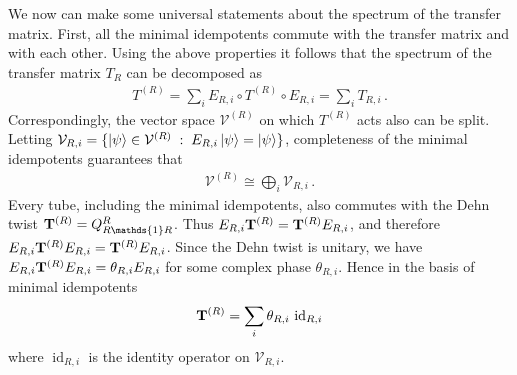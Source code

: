 We now can make some universal statements about the spectrum of the transfer matrix. 
First, all the minimal idempotents commute with the transfer matrix and with each other. 
Using the above properties it follows that the spectrum of the transfer matrix $T_R$ can be decomposed as
\begin{align} 
	T^{(R)}  = \sum_i E_{R,i}\circ T^{(R)}  \circ  E_{R,i} = \sum_i T_{R,i} \,. 
\label{TETE}
\end{align} 
Correspondingly, the vector space $\mathcal{V}^{(R)}$ on which $T^{(R)}$ acts also can be split.
Letting $\mathcal{V}_{R,i}= \{ \ket{\psi} \in \mathcal{V}^{(R)} \; : \; E_{R,i} \ket{\psi} = \ket{\psi} \} $, completeness of the minimal idempotents guarantees that
\begin{align}
	\mathcal{V}^{(R)} \cong \bigoplus_{i} \mathcal{V}_{R,i} \,.
\end{align}
Every tube, including the minimal idempotents, also commutes with the Dehn twist $\modT^{(R)} = Q_{R  \mathds{1} R}^R$. Thus $ E_{R,i} {\mathbf{T}}^{(R)} = {\mathbf{T}}^{(R)} E_{R,i}$, and therefore $E_{R,i} {\mathbf{T}}^{(R)} E_{R,i} = {\mathbf{T}}^{(R)} E_{R,i}$. 
Since the Dehn twist is unitary, we have $E_{R,i} {\mathbf{T}}^{(R)} E_{R,i} = \theta_{R,i} E_{R,i} $ for some complex phase $\theta_{R,i}$. 
Hence in the basis of minimal idempotents
\begin{align}
	{\mathbf{T}}^{(R)} = \sum_{i} \theta_{R,i}\, \operatorname{id}_{R,i}
\end{align}
where $\operatorname{id}_{R,i}$ is the identity operator on $\mathcal{V}_{R,i}$.

